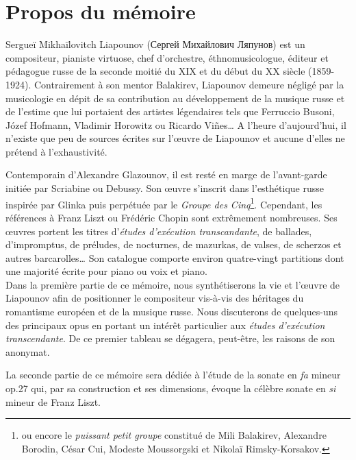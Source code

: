 
\chapter{Propos du mémoire}

Sergueï Mikhaïlovitch Liapounov (\foreignlanguage{russian}{Сергей Михайлович Ляпунов}) est un compositeur, pianiste virtuose, chef d'orchestre, éthnomusicologue, éditeur et pédagogue russe de la seconde moitié du XIX\ieme{} et du début du XX\ieme{} siècle (1859-1924). Contrairement à son mentor Balakirev, Liapounov demeure négligé par la musicologie en dépit de sa contribution au développement de la musique russe et de l'estime que lui portaient des artistes légendaires tels que Ferruccio Busoni, Józef Hofmann, Vladimir Horowitz ou Ricardo Vi\~{n}es\dots{} A l'heure d'aujourd'hui, il n'existe que peu de sources écrites sur l'œuvre de Liapounov et aucune d'elles ne prétend à l'exhaustivité.

Contemporain d'Alexandre Glazounov, il est resté en marge de l'avant-garde initiée par Scriabine ou Debussy. Son œuvre s'inscrit dans l’esthétique russe inspirée par Glinka puis perpétuée par le \emph{Groupe des Cinq}\footnote{ou encore le \emph{puissant petit groupe} constitué de Mili Balakirev, Alexandre Borodin, César Cui, Modeste Moussorgski et Nikolaï Rimsky-Korsakov.}. Cependant, les références à Franz Liszt ou Frédéric Chopin sont extrêmement nombreuses. Ses œuvres portent les titres d'\emph{études d'exécution transcandante}, de ballades, d'impromptus, de préludes, de nocturnes, de mazurkas, de valses, de scherzos et autres barcarolles\dots{} Son catalogue comporte environ quatre-vingt partitions dont une majorité écrite pour piano ou voix et piano.\\

Dans la première partie de ce mémoire, nous synthétiserons la vie et l'œuvre de Liapounov afin de positionner le compositeur vis-à-vis des héritages du romantisme européen et de la musique russe. Nous discuterons de quelques-uns des principaux opus en portant un intérêt particulier aux \emph{études d'exécution transcendante}. De ce premier tableau se dégagera, peut-être, les raisons de son anonymat.

La seconde partie de ce mémoire sera dédiée à l'étude de la sonate en \emph{fa} mineur op.27 qui, par sa construction et ses dimensions, évoque la célèbre sonate en \emph{si} mineur de Franz Liszt.

